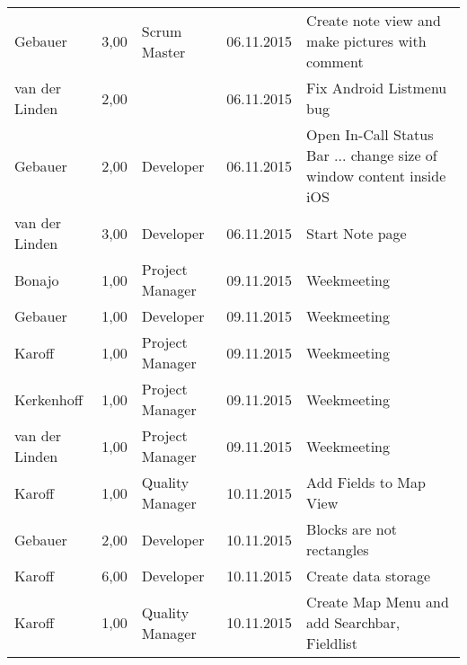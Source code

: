 \begin{longtable}{ l r p{2cm} c p{4cm} }
		Gebauer                 & 3,00           & Scrum Master          & 06.11.2015    & Create note view and make pictures with comment                                 \\
		van der Linden          & 2,00           &                       & 06.11.2015    & Fix Android Listmenu bug                                                        \\
		Gebauer                 & 2,00           & Developer             & 06.11.2015    & Open In-Call Status Bar ... change size of window content inside iOS            \\
		van der Linden          & 3,00           & Developer             & 06.11.2015    & Start Note page                                                                 \\
		Bonajo                  & 1,00           & Project Manager       & 09.11.2015    & Weekmeeting                                                                     \\
		Gebauer                 & 1,00           & Developer             & 09.11.2015    & Weekmeeting                                                                     \\
		Karoff                  & 1,00           & Project Manager       & 09.11.2015    & Weekmeeting                                                                     \\
		Kerkenhoff              & 1,00           & Project Manager       & 09.11.2015    & Weekmeeting                                                                     \\
		van der Linden          & 1,00           & Project Manager       & 09.11.2015    & Weekmeeting                                                                     \\
		Karoff                  & 1,00           & Quality Manager       & 10.11.2015    & Add Fields to Map View                                                          \\
		Gebauer                 & 2,00           & Developer             & 10.11.2015    & Blocks are not rectangles                                                       \\
		Karoff                  & 6,00           & Developer             & 10.11.2015    & Create data storage                                                             \\
		Karoff                  & 1,00           & Quality Manager       & 10.11.2015    & Create Map Menu and add Searchbar, Fieldlist                                    \\

\end{longtable}
